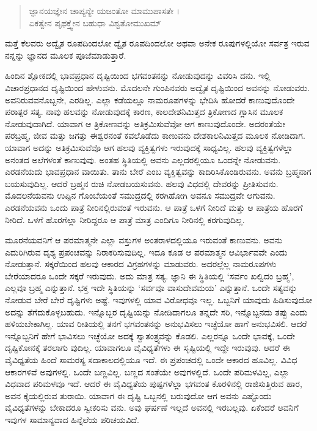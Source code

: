 \begin{verse}
ಜ್ಞಾನಯಜ್ಞೇನ ಚಾಪ್ಯನ್ಯೇ ಯಜಂತೋ ಮಾಮುಪಾಸತೇ ।\\ಏಕತ್ವೇನ ಪೃಥಕ್ತ್ವೇನ ಬಹುಧಾ ವಿಶ್ವತೋಮುಖಮ್ 
\end{verse}

{\small ಮತ್ತೆ ಕೆಲವರು ಅದ್ವೈತ ರೂಪದಿಂದಲೋ ದ್ವೈತ ರೂಪದಿಂದಲೋ ಅಥವಾ ಅನೇಕ ರೂಪುಗಳಲ್ಲಿಯೋ ಸರ್ವತ್ರ ಇರುವ ನನ್ನನ್ನು ಜ್ಞಾನದ ಮೂಲಕ ಪೂಜೆಮಾಡುತ್ತಾರೆ.}

ಹಿಂದಿನ ಶ್ಲೋಕದಲ್ಲಿ ಭಾವಪ್ರಧಾನ ದೃಷ್ಟಿಯಿಂದ ಭಗವಂತನನ್ನು ನೋಡುವುದನ್ನು ವಿವರಿಸಿ ದನು. ಇಲ್ಲಿ ವಿಚಾರಪ್ರಧಾನದ ದೃಷ್ಟಿಯಿಂದ ಹೇಳುವನು. ಮೊದಲನೇ ಗುಂಪಿನವರು ಅದ್ವೈತ ದೃಷ್ಟಿಯಿಂದ ಅವನನ್ನು ನೋಡುವರು. ಅವನಿರುವವನೊಬ್ಬನೇ, ಎರಡಿಲ್ಲ. ಎಲ್ಲಾ ಕಡೆಯಲ್ಲೂ ನಾಮರೂಪಗಳನ್ನು ಭೇದಿಸಿ ಹೋದರೆ ಕಾಣುವುದೊಂದೇ ಪರಾತ್ಪರ ಸತ್ಯ. ನಾವು ಹಲವನ್ನು ನೋಡುವುದಕ್ಕೆ ಕಾರಣ, ಕಾಲದೇಶನಿಮಿತ್ತದ ತ್ರಿಕೋಣದ ಗ್ಲಾಸಿನ ಮೂಲಕ ನೋಡುವುದಾಗಿದೆ. ಯಾವಾಗ ಆ ತ್ರಿಕೋಣವನ್ನು ಅತಿಕ್ರಮಿಸುವೆವೋ ಆಗ ಕಾಣುವುದೊಂದೇ. ಅದರಂತೆಯೇ ಪರಬ್ರಹ್ಮ, ಜೀವ ಮತ್ತು ಜಗತ್ತು ಈಶ್ವರನಂತೆ ಕವಲೊಡೆದು ಕಾಣುವನು ದೇಶಕಾಲನಿಮಿತ್ತದ ಮೂಲಕ ನೋಡಿದಾಗ. ಯಾವಾಗ ಅದನ್ನು ಅತಿಕ್ರಮಿಸುವೆವೊ ಆಗ ಹಲವು ವ್ಯಕ್ತಿತ್ವಗಳು ಇರುವುದಕ್ಕೆ ಸಾಧ್ಯವಿಲ್ಲ. ಹಲವು ವ್ಯಕ್ತಿತ್ವಗಳೆಲ್ಲಾ ಅನಂತದ ಅಲೆಗಳಂತೆ ಕಾಣುವುವು. ಅಂತಹ ಸ್ಥಿತಿಯಲ್ಲಿ ಅವನು ಎಲ್ಲದರಲ್ಲಿಯೂ ಒಂದನ್ನೇ ನೋಡುವನು. ಎರಡನೆಯದು ಭಾವಪ್ರಧಾನ ವಾಯಿತು. ತಾನು ಬೇರೆ ಎಂಬ ವ್ಯಕ್ತಿತ್ವವನ್ನು ಕಾದಿರಿಸಿಕೊಂಡಿರುವನು. ಅವನು ಬ್ರಹ್ಮನಾಗ ಬಯಸುವುದಿಲ್ಲ. ಆದರೆ ಬ್ರಹ್ಮನ ರುಚಿ ನೋಡಬಯಸುವನು. ಹಲವು ವಿಧದಲ್ಲಿ ದೇವರನ್ನು ಪ್ರೀತಿಸುವನು. ಮೊದಲನೆಯವನು ಉಪ್ಪಿನ ಗೊಂಬೆಯಂತೆ ಸಮುದ್ರದಲ್ಲಿ ಕರಗಿಹೋಗಿ ಅವನೂ ಸಮುದ್ರವೇ ಆಗುವನು. ಎರಡನೆಯವನು ಒಂದು ಪಾತ್ರೆ ನೀರಿನಲ್ಲಿರುವಂತೆ ಇರುವನು. ಆ ಪಾತ್ರೆ ಒಳಗೆ ನೀರಿದೆ ಮತ್ತು ಆ ಪಾತ್ರೆಯ ಹೊರಗೆ ನೀರಿದೆ. ಒಳಗೆ ಹೊರಗೆಲ್ಲಾ ನೀರಿದ್ದರೂ ಆ ಪಾತ್ರೆ ಮಾತ್ರ ಎಂದಿಗೂ ನೀರಿನಲ್ಲಿ ಕರಗುವುದಿಲ್ಲ.

ಮೂರನೆಯವನಿಗೆ ಆ ಪರಮಾತ್ಮನೇ ಎಲ್ಲಾ ವಸ್ತುಗಳ ಅಂತರಾಳದಲ್ಲಿಯೂ ಇರುವಂತೆ ಕಾಣುವನು. ಅವನು ಎದುರಿಗಿರುವ ದೃಶ್ಯ ಪ್ರಪಂಚವನ್ನು ನಿರಾಕರಿಸುವುದಿಲ್ಲ. ಇದೂ ಕೂಡ ಆ ಪರಮಾತ್ಮನ ಆವಿರ್ಭಾವವೇ ಎಂದು ನೋಡುತ್ತಾನೆ. ಸಕ್ಕರೆಯಿಂದ ಹಲವು ಆಕಾರದ ವಿಗ್ರಹಗಳನ್ನು ಮಾಡುವರು. ಅದರಲ್ಲೆಲ್ಲ ನಾಮರೂಪಗಳು ಬೇರೆಯಾದರೂ ಒಂದೇ ಸಕ್ಕರೆ ಇರುವುದು. ಅದು ಮಾತ್ರ ಸತ್ಯ. ಜ್ಞಾನಿ ಈ ಸ್ಥಿತಿಯಲ್ಲಿ ‘ಸರ್ವಂ ಖಲ್ವಿದಂ ಬ್ರಹ್ಮ’, ಎಲ್ಲವೂ ಬ್ರಹ್ಮ ಎನ್ನುತ್ತಾನೆ. ಭಕ್ತ ಇದೇ ಸ್ಥಿತಿಯನ್ನು ‘ಸರ್ವವೂ ವಾಸುದೇವಮಯ’ ಎನ್ನುತ್ತಾನೆ. ಒಂದೇ ಸತ್ಯವನ್ನು ನೋಡುವ ಬೇರೆ ಬೇರೆ ದೃಷ್ಟಿಗಳು ಅಷ್ಟೆ. ಇವುಗಳಲ್ಲಿ ಯಾವ ವಿರೋಧವೂ ಇಲ್ಲ. ಒಬ್ಬನಿಗೆ ಯಾವುದು ಹಿಡಿಸುವುದೋ ಅದನ್ನು ತೆಗೆದುಕೊಳ್ಳಬಹುದು. ಇನ್ನೊಬ್ಬರ ದೃಷ್ಟಿಯನ್ನು ನೋಡಿದಾಗಲೂ ತನ್ನದೇ ಸರಿ, ಇನ್ನೊಬ್ಬನದು ತಪ್ಪು ಎಂದು ಹಳಿಯಬೇಕಾಗಿಲ್ಲ. ಯಾವ ರೀತಿಯಲ್ಲಿ ತನಗೆ ಭಗವಂತನನ್ನು ಅನುಭವಿಸಲು ಇಚ್ಛೆಯೋ ಹಾಗೆ ಅನುಭವಿಸಲಿ. ಆದರೆ ಇನ್ನೊಬ್ಬನಿಗೆ ಹೇಗೆ ಭಾವಿಸಲು ಇಚ್ಛೆಯೋ ಅದಕ್ಕೆ ಸ್ವಾತಂತ್ರ್ಯವನ್ನು ಕೊಡಲಿ. ಎಲ್ಲರನ್ನೂ ಒಂದೇ ಭಾವಕ್ಕೆ, ಒಂದೇ ದೃಷ್ಟಿಕೋನಕ್ಕೆ ತರಲಾಗು ವುದಿಲ್ಲ. ಯಾವಾಗಲೂ ವೈವಿಧ್ಯತೆಗಳು ಈ ಸೃಷ್ಟಿಯಲ್ಲಿ ಇದ್ದೇ ಇರುವುವು. ಆದರೆ ಈ ವೈವಿಧ್ಯತೆಯ ಹಿಂದೆ ಸಾಮರಸ್ಯ ಸದಾಕಾಲದಲ್ಲಿಯೂ ಇದೆ. ಈ ಪ್ರಪಂಚದಲ್ಲಿ ಒಂದೇ ಆಕಾರದ ಹೂವಿಲ್ಲ. ವಿವಿಧ ಆಕಾರಗಳಿವೆ ಅವುಗಳಲ್ಲಿ. ಒಂದೇ ಬಣ್ಣವಿಲ್ಲ. ಬಣ್ಣದ ಸಂತೆಯೇ ಅವುಗಳಲ್ಲಿದೆ. ಒಂದೇ ಪರಿಮಳವಿಲ್ಲ, ಎಲ್ಲಾ ವಿಧವಾದ ಪರಿಮಳವೂ ಇದೆ. ಆದರೆ ಈ ವೈವಿಧ್ಯತೆಯ ಪುಷ್ಪಗಳೆಲ್ಲಾ ಭಗವಂತ ಕೊರಳಿನಲ್ಲಿ ರಾಜಿಸುತ್ತಿರುವ ಹಾರ, ಅವನ ಕೈಯಲ್ಲಿರುವ ತುರಾಯಿ. ಯಾವಾಗ ಈ ದೃಷ್ಟಿ ಒಬ್ಬನಲ್ಲಿ ಬರುವುದೋ ಆಗ ಅವನು ಎಷ್ಟೊಂದು ವೈವಿಧ್ಯತೆಗಳನ್ನು ಬೇಕಾದರೂ ಸ್ವೀಕರಿಸು ವನು. ಅವು ಘರ್ಷಣೆ ಇಲ್ಲದೆ ಅವನಲ್ಲಿ ಇರಬಲ್ಲವು. ಏಕೆಂದರೆ ಅವನಿಗೆ ಇವುಗಳ ಸಾಮಾನ್ಯವಾದ ಹಿನ್ನೆಲೆಯ ಪರಿಚಯವಿದೆ.

